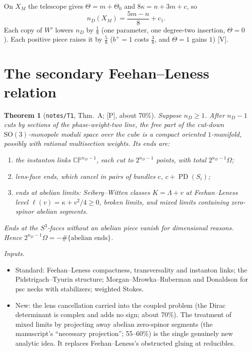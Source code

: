 \documentclass[10pt]{amsart}
\newtheorem{theorem}{Theorem}\newtheorem{lemma}[theorem]{Lemma}\newtheorem{proposition}[theorem]{Proposition}
\theoremstyle{definition}\newtheorem{definition}[theorem]{Definition}\newtheorem{remark}[theorem]{Remark}
\newcommand{\CP}{\mathbb{CP}}\newcommand{\CPb}{\overline{\mathbb{CP}}{}^2}
\newcommand{\PD}{\operatorname{PD}}\newcommand{\CS}{\operatorname{CS}}
\newcommand{\V}{\textsf{[V]}}\newcommand{\Pl}{\textsf{[P]}}\newcommand{\Sp}{\textsf{[S]}}
\begin{document}
On $X_M$ the telescope gives $\Theta=m+\Theta_0$ and $8\kappa=n+3m+c$, so
\[
n_D(X_M)=\frac{5m-n}{8}+c_1 .
\]
Each copy of $W'$ lowers $n_D$ by $\tfrac18$ (one parameter, one degree-two insertion, $\Theta=0$). Each positive piece raises it by $\tfrac58$ ($b^+=1$ costs $\tfrac38$, and $\Theta=1$ gains $1$) \V.

\section{The secondary Feehan--Leness relation}
\begin{theorem}[\texttt{notes/T1}, Thm.~A; \Pl, about 70\%]\label{thm:FL}
Suppose $n_D\ge1$. After $n_D-1$ cuts by sections of the phase-weight-two line, the free part of the cut-down $\mathrm{SO}(3)$-monopole moduli space over the cube is a compact oriented $1$-manifold, possibly with rational multisection weights. Its ends are:
\begin{enumerate}
\item the instanton links $\CP^{n_D-1}$, each cut to $2^{n_D-1}$ points, with total $2^{n_D-1}\Omega$;
\item lens-face ends, which cancel in pairs of bundles $c$, $c+\PD(S_i)$;
\item ends at abelian limits: Seiberg--Witten classes $K=\Lambda+v$ at Feehan--Leness level $\ell(v)=\kappa+v^2/4\ge0$, broken limits, and mixed limits containing zero-spinor abelian segments.
\end{enumerate}
Ends at the $S^3$-faces without an abelian piece vanish for dimensional reasons. Hence $2^{n_D-1}\Omega=-\#\{\text{abelian ends}\}$.
\end{theorem}
\noindent\emph{Inputs.}
\begin{itemize}
\item Standard: Feehan--Leness compactness, transversality and instanton links; the Pidstrigach--Tyurin structure; Morgan--Mrowka--Ruberman and Donaldson for psc necks with stabilizers; weighted Stokes.
\item New: the lens cancellation carried into the coupled problem (the Dirac determinant is complex and adds no sign; about 70\%). The treatment of mixed limits by projecting away abelian zero-spinor segments (the manuscript's ``necessary projection''; 55--60\%) is the single genuinely new analytic idea. It replaces Feehan--Leness's obstructed gluing at reducibles.
\end{itemize}
\end{document}
